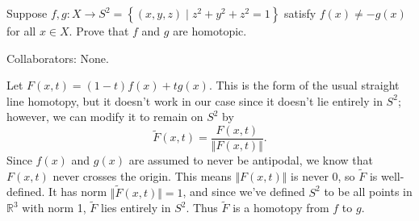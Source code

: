 \documentclass[10pt]{report}
\begin{document}
\pagebreak
\begin{exer}[]
	Suppose $f,g:X\to S^2 = \left\{ (x,y,z) \;|\; z^2+y^2+z^2=1 \right\}$ satisfy $f(x) \neq -g(x)$ for all $x \in X$. Prove that $f$ and $g$ are homotopic.
\end{exer}
{\color{blue}Collaborators: None.}

Let $F(x,t) = (1-t)f(x) + tg(x)$. This is the form of the usual straight line homotopy, but it doesn't work in our case since it doesn't lie entirely in $S^2$; however, we can modify it to remain on $S^2$ by
\[
	\tilde{F}(x,t) = \frac{F(x,t)}{{\Vert{F(x,t)}\Vert}} .
\] Since $f(x)$ and $g(x)$ are assumed to never be antipodal, we know that $F(x,t)$ never crosses the origin. This means ${\Vert{F(x,t)}\Vert}$ is never 0, so $\tilde{F}$ is well-defined. It has norm ${\Vert{\tilde{F}(x,t)}\Vert}=1$, and since we've defined $S^2$ to be all points in $\mathbb{R}^3$ with norm 1, $\tilde{F}$ lies entirely in $S^2$. Thus $\tilde{F}$ is a homotopy from $f$ to $g$.
\end{document}
